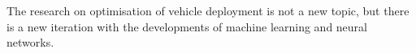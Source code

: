 \hspace{1 em} The research on optimisation of vehicle deployment is not a new topic,
but there is a new iteration with the developments of machine learning and neural networks.

